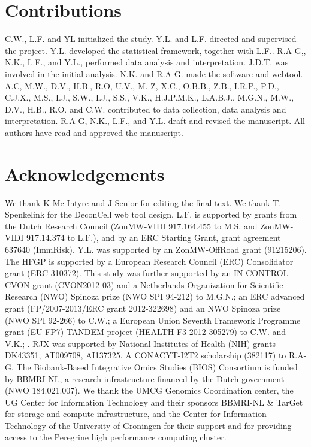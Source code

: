 \section{Contributions}
C.W., L.F. and YL initialized the study. Y.L. and L.F. directed and supervised the project. Y.L. developed the statistical framework, together with L.F.. R.A-G,, N.K., L.F., and Y.L., performed data analysis and interpretation. J.D.T. was involved in the initial analysis. N.K. and R.A-G. made the software and webtool. A.C, M.W., D.V., H.B., R.O, U.V., M. Z, X.C., O.B.B., Z.B., I.R.P., P.D., C.J.X., M.S., I.J., S.W., I.J., S.S., V.K., H.J.P.M.K., L.A.B.J., M.G.N., M.W., D.V., H.B., R.O. and C.W. contributed to data collection, data analysis and interpretation. R.A-G, N.K., L.F., and Y.L. draft and revised the manuscript. All authors have read and approved the manuscript.

\section*{Acknowledgements}
We thank K Mc Intyre and J Senior for editing the final text. We thank T. Spenkelink for the DeconCell web tool design. L.F. is supported by grants from the Dutch Research Council (ZonMW-VIDI 917.164.455 to M.S. and ZonMW-VIDI 917.14.374 to L.F.), and by an ERC Starting Grant, grant agreement 637640 (ImmRisk). Y.L. was supported by an ZonMW-OffRoad grant (91215206). The HFGP is supported by a European Research Council (ERC) Consolidator grant (ERC 310372). This study was further supported by an IN-CONTROL CVON grant (CVON2012-03) and a Netherlands Organization for Scientific Research (NWO) Spinoza prize (NWO SPI 94-212) to M.G.N.; an ERC advanced grant (FP/2007-2013/ERC grant 2012-322698) and an NWO Spinoza prize (NWO SPI 92-266) to C.W.; a European Union Seventh Framework Programme grant (EU FP7) TANDEM project (HEALTH-F3-2012-305279) to C.W. and V.K.; . RJX was supported by National Institutes of Health (NIH) grants - DK43351, AT009708, AI137325. A CONACYT-I2T2 scholarship (382117) to R.A-G. The Biobank-Based Integrative Omics Studies (BIOS) Consortium is funded by BBMRI-NL, a research infrastructure financed by the Dutch government (NWO 184.021.007). We thank the UMCG Genomics Coordination center, the UG Center for Information Technology and their sponsors BBMRI-NL \& TarGet for storage and compute infrastructure, and the Center for Information Technology of the University of Groningen for their support and for providing access to the Peregrine high performance computing cluster.

